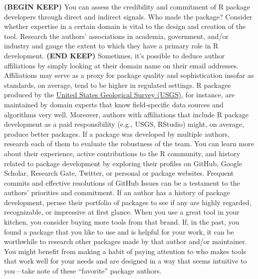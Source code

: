 \documentclass[10pt,letterpaper]{article}
\begin{document}
\textbf{(BEGIN KEEP)} You can assess the credibility and commitment of R
package developers through direct and indirect signals. Who made the
package? Consider whether expertise in a certain domain is vital to the
design and creation of the tool. Research the authors' associations in
academia, government, and/or industry and gauge the extent to which they
have a primary role in R development. \textbf{(END KEEP)} Sometimes,
it's possible to deduce author affiliations by simply looking at their
domain name on their email addresses. Affiliations may serve as a proxy
for package quality and sophistication insofar as standards, on average,
tend to be higher in regulated settings. R packages produced by the
\href{https://owi.usgs.gov/R/}{United States Geological Survey (USGS)},
for instance, are maintained by domain experts that know field-specific
data sources and algorithms very well. Moreover, authors with
affiliations that include R package development as a paid responsibility
(e.g., USGS, RStudio) might, on average, produce better packages. If a
package was developed by multiple authors, research each of them to
evaluate the robustness of the team. You can learn more about their
experience, active contributions to the R community, and history related
to package development by exploring their profiles on GitHub, Google
Scholar, Research Gate, Twitter, or personal or package websites.
Frequent commits and effective resolutions of GitHub Issues can be a
testament to the authors' priorities and commitment. If an author has a
history of package development, peruse their portfolio of packages to
see if any are highly regarded, recognizable, or impressive at first
glance. When you use a great tool in your kitchen, you consider buying
more tools from that brand. If, in the past, you found a package that
you like to use and is helpful for your work, it can be worthwhile to
research other packages made by that author and/or maintainer. You might
benefit from making a habit of paying attention to who makes tools that
work well for your needs and are designed in a way that seems intuitive
to you---take note of these ``favorite'' package authors.
\end{document}

